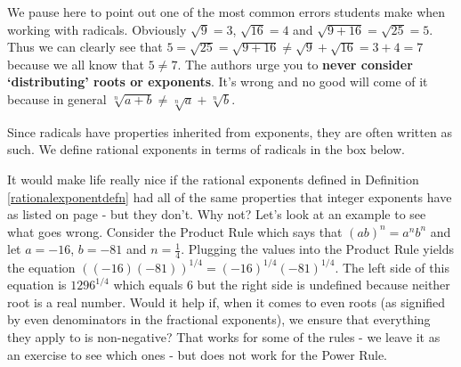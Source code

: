 
\smallskip

We pause here to point out one of the most common errors students make when working with radicals.  Obviously $\sqrt{9} = 3$, $\sqrt{16} = 4$ and $\sqrt{9 + 16} = \sqrt{25} = 5$.  Thus we can clearly see that $5 = \sqrt{25} = \sqrt{9 + 16} \neq \sqrt{9} + \sqrt{16} = 3 + 4 = 7$ because we all know that $5 \neq 7$.  The authors urge you to \textbf{never consider `distributing' roots or exponents}.  It's wrong and no good will come of it because in general $\sqrt[n]{a+b} \neq \sqrt[n]{a} + \sqrt[n]{b}$. 

\label{donotdistributeexponents}

\smallskip

Since radicals have properties inherited from exponents, they are often written as such.  We define rational exponents in terms of radicals in the box below.

\medskip


\medskip

It would make life really nice if the rational exponents defined in Definition \ref{rationalexponentdefn} had all of the same properties that integer exponents have as listed on page \pageref{propertiesofintegerexponents}  - but they don't.  Why not?  Let's look at an example to see what goes wrong.  Consider the Product Rule which says that $(ab)^{n} = a^{n}b^{n}$ and let $a = -16$, $b = -81$ and $n = \frac{1}{4}$.  Plugging the values into the Product Rule yields the equation $((-16)(-81))^{1/4} = (-16)^{1/4}(-81)^{1/4}$.  The left side of this equation is $1296^{1/4}$ which equals $6$ but the right side is undefined because neither root is a real number.  Would it help if, when it comes to even roots (as signified by even denominators in the fractional exponents), we ensure that everything they apply to is non-negative?  That works for some of the rules - we leave it as an exercise to see which ones - but does not work for the Power Rule.

